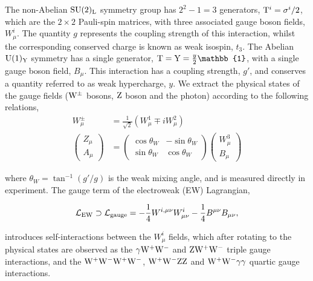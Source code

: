 \noindent
The non-Abelian ${\rm{SU}}(2)_{\rm{L}}$ symmetry group has $2^2-1=3$ generators, ${\rm{T}}^i=\sigma^i/2$, which are the $2\times2$ Pauli-spin matrices, with three associated gauge boson fields, $W^i_\mu$. The quantity $g$ represents the coupling strength of this interaction, whilst the corresponding conserved charge is known as weak isospin, $t_3$. The Abelian ${\rm{U}}(1)_{\rm{Y}}$ symmetry has a single generator, ${\rm{T}}={\rm{Y}}=\frac{y}{2}\mathbb{1}$, with a single gauge boson field, $B_\mu$. This interaction has a coupling strength, $g'$, and conserves a quantity referred to as weak hypercharge, $y$. We extract the physical states of the gauge fields (${\rm{W}}^\pm$ bosons, ${\rm{Z}}$ boson and the photon) according to the following relations,
\begin{equation}\label{eq:ew_rotation}
\begin{split}
    W^{\pm}_\mu &= \frac{1}{\sqrt{2}}(W_\mu^1 \mp iW_\mu^2) \\
    \begin{pmatrix}
    Z_\mu \\
    A_\mu
    \end{pmatrix} 
    &= 
    \begin{pmatrix}
    \cos{\theta_W} & -\sin{\theta_W} \\
    \sin{\theta_W} & \cos{\theta_W}
    \end{pmatrix} 
    \begin{pmatrix}
    W^3_\mu \\
    B_\mu
    \end{pmatrix}
\end{split}
\end{equation}

\noindent
where $\theta_W=\tan^{-1}(g'/g)$ is the weak mixing angle, and is measured directly in experiment. The gauge term of the electroweak (EW) Lagrangian,

\begin{equation}
    \mathcal{L}_{\rm{EW}} \supset \mathcal{L}_{\rm{gauge}} = -\frac{1}{4}W^{i,\mu\nu}W^i_{\mu\nu} - \frac{1}{4}B^{\mu\nu}B_{\mu\nu},
\end{equation}

\noindent
introduces self-interactions between the $W^i_\mu$ fields, which after rotating to the physical states are observed as the $\gamma\rm{W^+W^-}$ and ${\rm{Z W^+W^-}}$ triple gauge interactions, and the $\rm{W^+W^-W^+W^-}$, $\rm{W^+W^-ZZ}$ and ${\rm{W^+W^-}}\gamma\gamma$ quartic gauge interactions.

